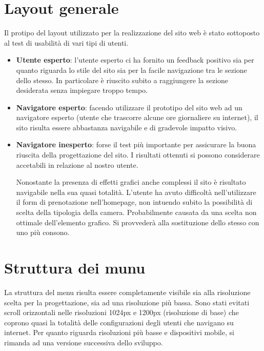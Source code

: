 \documentclass[a4paper,12pt,hidelinks]{report}
\begin{document}
\section*{Layout generale}
Il protipo del layout utilizzato per la realizzazione del sito web è stato sottoposto al test di usabilità di vari tipi di utenti.
\begin{itemize}
 \item \textbf{Utente esperto}: l'utente esperto ci ha fornito un feedback positivo sia per quanto riguarda lo stile del sito sia per la facile navigazione tra le sezione
 dello stesso. In particolare è riuscito subito a raggiungere la sezione desiderata senza impiegare troppo tempo.
 \item \textbf{Navigatore esperto}: facendo utilizzare il prototipo del sito web ad un navigatore esperto (utente che trascorre alcune ore giornaliere su internet), il sito 
 risulta essere abbastanza navigabile e di gradevole impatto visivo.
 \item \textbf{Navigatore inesperto}: forse il test più importante per assicurare la buona riuscita della progettazione del sito. I risultati ottenuti si possono considerare 
 accetabili in relazione al nostro utente. 
 \par Nonostante la presenza di effetti grafici anche complessi il sito è risultato navigabile nella sua quasi totalità. L'utente 
 ha avuto difficoltà nell'utilizzare il form di prenotazione nell'homepage, non intuendo subito la possibilità di scelta della tipologia della camera. Probabilmente causata
 da una scelta non ottimale dell'elemento grafico. Si provvederà alla sostituzione dello stesso con uno più consono.
\end{itemize}

\section*{Struttura dei munu}
La struttura del menu risulta essere completamente visibile sia alla risoluzione scelta per la progettazione, sia ad una risoluzione più bassa.
Sono stati evitati scroll orizzontali nelle risoluzioni 1024px e 1200px (risoluzione di base) che coprono quasi la totalità delle configurazioni degli utenti che navigano
su internet.
Per quanto riguarda risoluzioni più basse e dispositivi mobile, si rimanda ad una versione successiva dello sviluppo.
\end{document}
